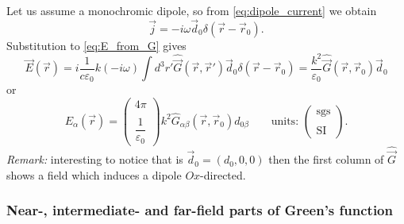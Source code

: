 \begin{testexample}
	Let us assume a monochromic dipole, so from \eqref{eq:dipole_current} we obtain
	\begin{equation}
		\vec{j} = -i\omega \vec{d}_0 \delta(\vec{r} - \vec{r}_0).
	\end{equation}
	Substitution to \eqref{eq:E_from_G} gives
	\begin{equation}
		\vec{E}(\vec{r}) = i \frac{1}{c \varepsilon_0}k (-i\omega) \int d^3 r' \hat{\vec{G}}(\vec{r}, \vec{r}') \vec{d}_0 \delta(\vec{r} - \vec{r}_0) = \frac{k^2}{\varepsilon_0} \hat{\vec{G}}(\vec{r}, \vec{r}_0) \vec{d}_0
	\end{equation}
	or
	\begin{equation}
		E_{\alpha}(\vec{r}) = \begin{pmatrix}
		4\pi  \\ \\
		\dfrac{1}{\varepsilon_0}
		\end{pmatrix} k^2  \hat{G}_{\alpha \beta}(\vec{r}, \vec{r}_0) d_{0 \beta} \qquad \text{units: }\begin{pmatrix}
		\text{sgs}  \\ \\
		\text{SI}
		\end{pmatrix}.
	\end{equation}
	\textit{Remark:} interesting to notice that is $\vec{d}_0 = (d_0,0,0)$ then the first column of $\hat{\vec{G}}$ shows a field which induces a dipole $Ox$-directed.
\end{testexample}

\subsubsection{Near-, intermediate- and far-field parts of Green's function}

